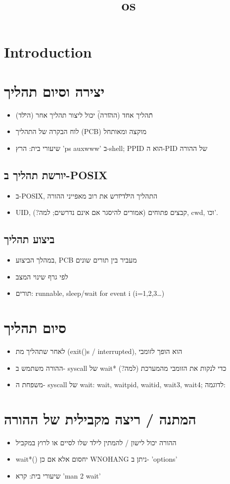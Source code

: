 \documentclass[12pt]{report}
\title{os}
\author{}
\begin{document}
\maketitle
\tableofcontents
\newpage

\section{Introduction}
  \section{יצירה וסיום תהליך}  \begin{itemize}  \item תהליך אחד (ה\"הורה\") יכול ליצור תהליך אחר (ה\"ילד\")  \item לוח הבקרה של התהליך (PCB) מוקצה ומאותחל  \item שיעורי בית: הרץ 'ps auxwww' ב-shell; PPID הוא ה-PID של ההורה  \end{itemize}    \subsection{יורשת תהליך ב-POSIX}  \begin{itemize}  \item ב-POSIX, התהליך ה\"ילד\" יורש את רוב מאפייני ההורה  \item UID, קבצים פתוחים (אמורים להיסגר אם אינם נדרשים; למה?), cwd, וכו'.  \end{itemize}    \subsection{ביצוע תהליך}  \begin{itemize}  \item במהלך הביצוע, PCB מעביר בין תורים שונים  \item לפי גרף שינוי המצב  \item תורים: runnable, sleep/wait for event i (i=1,2,3…)  \end{itemize}    \section{סיום תהליך}  \begin{itemize}  \item לאחר שתהליך מת (exit()s / interrupted), הוא הופך לזומבי  \item ההורה משתמש ב- syscall של wait* כדי לנקות את הזומבי מהמערכת (למה?)  \item משפחת ה- syscall של wait: wait, waitpid, waitid, wait3, wait4; לדוגמה:  \end{itemize}    \section{המתנה / ריצה מקבילית של ההורה}  \begin{itemize}  \item ההורה יכול לישון / להמתין לילד שלו לסיים או לרוץ במקביל  \item wait*() יחסום אלא אם כן WNOHANG ניתן ב- 'options'  \item שיעורי בית: קרא 'man 2 wait'  \end{itemize}  
\end{document}
